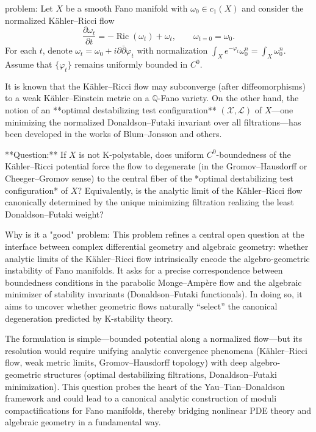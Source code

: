 problem:  
Let \( X \) be a smooth Fano manifold with \( \omega_0 \in c_1(X) \) and consider the normalized Kähler–Ricci flow  
\[
\frac{\partial \omega_t}{\partial t} = -\operatorname{Ric}(\omega_t) + \omega_t, \qquad \omega_{t=0} = \omega_0.
\]  
For each \( t \), denote \( \omega_t = \omega_0 + i\partial\bar{\partial}\varphi_t \) with normalization \(\int_X e^{-\varphi_t} \omega_0^n = \int_X \omega_0^n\).  
Assume that \( \{\varphi_t\} \) remains uniformly bounded in \(C^0\).  

It is known that the Kähler–Ricci flow may subconverge (after diffeomorphisms) to a weak Kähler–Einstein metric on a \(\mathbb{Q}\)-Fano variety. On the other hand, the notion of an **optimal destabilizing test configuration** \( (\mathcal{X}, \mathcal{L}) \) of \( X \)—one minimizing the normalized Donaldson–Futaki invariant over all filtrations—has been developed in the works of Blum–Jonsson and others.  

**Question:**  
If \(X\) is not K-polystable, does uniform \(C^0\)-boundedness of the Kähler–Ricci potential force the flow to degenerate (in the Gromov–Hausdorff or Cheeger–Gromov sense) to the central fiber of the *optimal destabilizing test configuration* of \(X\)?  
Equivalently, is the analytic limit of the Kähler–Ricci flow canonically determined by the unique minimizing filtration realizing the least Donaldson–Futaki weight?

Why is it a "good" problem:  
This problem refines a central open question at the interface between complex differential geometry and algebraic geometry: whether analytic limits of the Kähler–Ricci flow intrinsically encode the algebro-geometric instability of Fano manifolds. It asks for a precise correspondence between boundedness conditions in the parabolic Monge–Ampère flow and the algebraic minimizer of stability invariants (Donaldson–Futaki functionals). In doing so, it aims to uncover whether geometric flows naturally “select” the canonical degeneration predicted by K-stability theory.  

The formulation is simple—bounded potential along a normalized flow—but its resolution would require unifying analytic convergence phenomena (Kähler–Ricci flow, weak metric limits, Gromov–Hausdorff topology) with deep algebro-geometric structures (optimal destabilizing filtrations, Donaldson–Futaki minimization). This question probes the heart of the Yau–Tian–Donaldson framework and could lead to a canonical analytic construction of moduli compactifications for Fano manifolds, thereby bridging nonlinear PDE theory and algebraic geometry in a fundamental way.